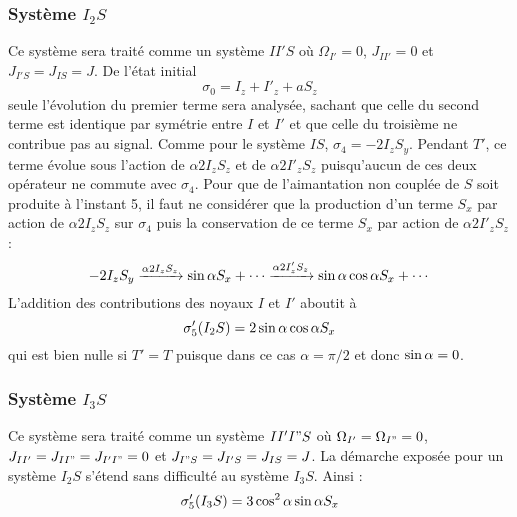 \subsubsection{Système $I_2S$}
Ce système sera traité comme un système $II'S$ où $\Omega_{I'} = 0$,
$J_{II'} = 0$ et $J_{I'S} = J_{IS} = J$.
De l'état initial
\begin{equation}
\sigma_0 = I_z + I'_z + aS_z
\end{equation}
seule l'évolution du premier terme sera analysée, sachant que celle du second terme
est identique par symétrie entre $I$ et $I'$ et que celle du troisième
ne contribue pas au signal.
Comme pour le système $IS$, $\sigma_4 = -2I_zS_y$.
Pendant $T'$, ce terme évolue sous l'action de $\alpha 2I_zS_z$ et de $\alpha 2I'_zS_z$
puisqu'aucun de ces deux opérateur ne commute avec $\sigma_4$.
Pour que de l'aimantation non couplée de $S$ soit produite à l'instant 5, il faut
ne considérer que la production d'un terme $S_x$ par action de $\alpha 2I_zS_z$ sur
$\sigma_4$ puis la conservation de ce terme $S_x$ par action de $\alpha 2I'_zS_z$:
\begin{equation}
-2I_zS_y \xrightarrow{\alpha 2I_zS_z} \sin\alpha S_x + \cdots \xrightarrow{\alpha 2I'_zS_z} \sin\alpha\cos\alpha S_x + \cdots
\end{equation}
L'addition des contributions des noyaux $I$ et $I'$ aboutit à
\begin{equation}
\sigma_5' (I_2S) = 2\sin\alpha\cos\alpha S_x
\end{equation}
qui est bien nulle si $T' = T$ puisque dans ce cas $\alpha = \pi/2$ et donc $\sin\alpha = 0$.

\subsubsection{Système $I_3S$}
Ce système sera traité comme un système $II'I"S$ où $\Omega_{I'} = \Omega_{I"} = 0$,
$J_{II'} = J_{II"} = J_{I'I"} = 0$ et $J_{I"S} = J_{I'S} = J_{IS} = J$.
La démarche exposée pour un système $I_2S$ s'étend sans difficulté au système $I_3S$.
Ainsi :
\begin{equation}
\sigma_5' (I_3S) = 3\cos^2\alpha\sin\alpha S_x
\end{equation}


